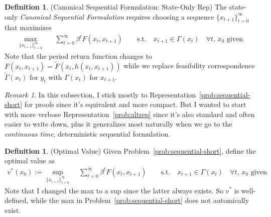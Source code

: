 \documentclass[12pt]{book}
\numberwithin{equation}{section} %
\theoremstyle{plain}
\theoremstyle{definition}
\newtheorem{defn}[thm]{Definition}
\theoremstyle{remark}
\newtheorem*{rmk}{Remark}
\newcommand{\sumtinfz}{\sum^\infty_{t=0}}
\begin{document}
\begin{defn}{(Canonical Sequential Formulation: State-Only Rep)}
The state-only \emph{Canonical Sequential Formulation} requires choosing
a sequence $\{x_{t+1}\}_{t=0}^\infty$ that maximizes
\begin{align}
  \label{prob:sequential-short}
  \max_{\{x_{t+1}\}_{t=0}^\infty}
  \quad &\sumtinfz \beta^t F(x_t,x_{t+1})
  \qquad \text{s.t.}\quad
  \text{$x_{t+1} \in \Gamma(x_t)$ $\;\forall t$, $x_0$ given}
\end{align}
Note that the period return function changes to
$F(x_t,x_{t+1})=\tilde{F}(x_t,h(x_t,x_{t+1}))$ while we replace
feasibility correspondence $\tilde{\Gamma}(x_t)$ for $y_t$ with
$\Gamma(x_t)$ for $x_{t+1}$.
\end{defn}

\begin{rmk}
In this subsection, I stick mostly to
Representation~\ref{prob:sequential-short} for proofs since it's
equivalent and more compact.
But I wanted to start with more verbose Representation~\ref{prob:altrep}
since it's also standard and often easier to write down, plus it
generalizes most naturally when we go to the \emph{continuous time},
deterministic sequential formulation.
\end{rmk}



\begin{defn}{(Optimal Value)}
\label{defn:vstar}
Given Problem~\ref{prob:sequential-short}, define the optimal value as
\begin{align}
  v^*(x_0) := \sup_{\{x_{t+1}\}_{t=0}^\infty}
  \; &\sumtinfz \beta^t F(x_t,x_{t+1})
  \qquad \text{s.t.}\quad
  \text{$x_{t+1} \in \Gamma(x_t)$ $\;\forall t$, $x_0$ given}
  \label{vstar}
\end{align}
Note that I changed the max to a sup since the latter always exists.
So $v^*$ is well-defined, while the max in
Problem~\ref{prob:sequential-short} does not automically exist.
\end{defn}
\end{document}
